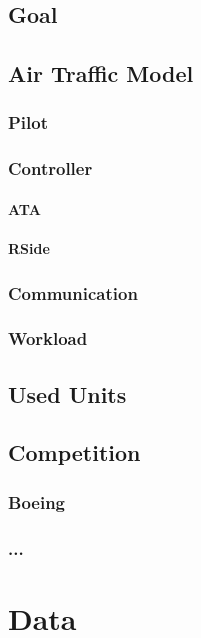 \section{Goal}

\section{Air Traffic Model}
\subsection{Pilot}
\subsection{Controller}
\subsubsection{ATA}
\subsubsection{RSide}
\subsection{Communication}
\subsection{Workload}

\section{Used Units}

\section{Competition}
\subsection{Boeing}
\subsection{...}






\chapter{Data}
